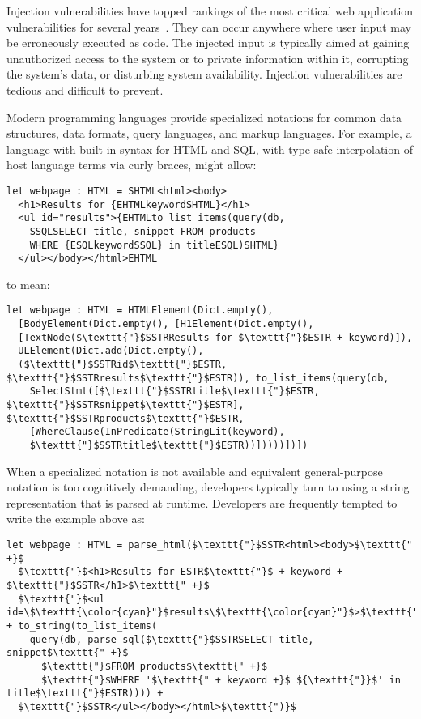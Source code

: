 \documentclass{sig-alternate}
\begin{document}
Injection vulnerabilities have topped rankings of the most critical web application vulnerabilities for several years~\cite{cwsans,owasp}. They can occur anywhere where user input may be erroneously executed as code. The injected input is typically aimed at gaining unauthorized access to the system or to private information within it, corrupting the system's data, or disturbing system availability. Injection vulnerabilities are tedious and difficult to prevent.

Modern programming languages  provide specialized notations for common data structures, data formats, query languages, and markup languages. For example, a language with built-in syntax for HTML and SQL, with type-safe interpolation of host language terms via curly braces, might allow:

\begin{lstlisting}
let webpage : HTML = SHTML<html><body>
  <h1>Results for {EHTMLkeywordSHTML}</h1>
  <ul id="results">{EHTMLto_list_items(query(db, 
    SSQLSELECT title, snippet FROM products
    WHERE {ESQLkeywordSSQL} in titleESQL)SHTML}
  </ul></body></html>EHTML
\end{lstlisting}

to mean:

\begin{lstlisting}
let webpage : HTML = HTMLElement(Dict.empty(),
  [BodyElement(Dict.empty(), [H1Element(Dict.empty(),
  [TextNode($\texttt{"}$SSTRResults for $\texttt{"}$ESTR + keyword)]), 
  ULElement(Dict.add(Dict.empty(),
  ($\texttt{"}$SSTRid$\texttt{"}$ESTR, $\texttt{"}$SSTRresults$\texttt{"}$ESTR)), to_list_items(query(db, 
    SelectStmt([$\texttt{"}$SSTRtitle$\texttt{"}$ESTR, $\texttt{"}$SSTRsnippet$\texttt{"}$ESTR], $\texttt{"}$SSTRproducts$\texttt{"}$ESTR, 
    [WhereClause(InPredicate(StringLit(keyword),
    $\texttt{"}$SSTRtitle$\texttt{"}$ESTR))]))))])])
\end{lstlisting}

When a specialized notation is not available and equivalent general-purpose notation is too cognitively demanding, developers typically turn to using a string representation that is parsed at runtime. Developers are frequently  tempted to write the example above as:

\begin{lstlisting}
let webpage : HTML = parse_html($\texttt{"}$SSTR<html><body>$\texttt{" +}$
  $\texttt{"}$<h1>Results for ESTR$\texttt{"}$ + keyword + $\texttt{"}$SSTR</h1>$\texttt{" +}$
  $\texttt{"}$<ul id=\$\texttt{\color{cyan}"}$results\$\texttt{\color{cyan}"}$>$\texttt{"}$ESTR + to_string(to_list_items(
    query(db, parse_sql($\texttt{"}$SSTRSELECT title, snippet$\texttt{" +}$
      $\texttt{"}$FROM products$\texttt{" +}$
      $\texttt{"}$WHERE '$\texttt{" + keyword +}$ ${\texttt{"}}$' in title$\texttt{"}$ESTR)))) + 
  $\texttt{"}$SSTR</ul></body></html>$\texttt{")}$
\end{lstlisting}
\end{document}
